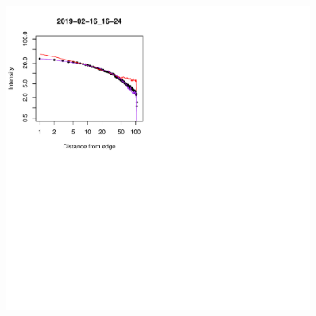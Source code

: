 \documentclass[final,hyperref={pdfpagelabels=false}]{beamer}
\begin{document}
\begin{frame}[t]
\begin{columns}[t]
\begin{column}{.23\textwidth}
\end{column} %

\begin{column}{.01\textwidth}\end{column} %
\begin{column}{.23\textwidth}
\begin{block}{}
\begin{figure}
   \centering 
\includegraphics[scale=1.08,viewport=2 261 232 496,clip]{fig/slopes_compared_2019-02-16_16-24.pdf}

\end{figure}
\end{block}
\end{column}
\end{columns}
\end{frame}
\end{document}
